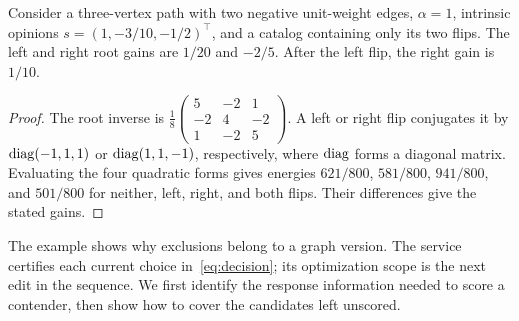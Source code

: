 \begin{proposition}\label{prop:revival}
Consider a three-vertex path with two negative unit-weight edges, $\alpha=1$, intrinsic opinions $s=(1,-3/10,-1/2)^\top$, and a catalog containing only its two flips. The left and right root gains are $1/20$ and $-2/5$. After the left flip, the right gain is $1/10$.
\end{proposition}
\begin{proof}
The root inverse is $\frac18\left(\begin{smallmatrix}5&-2&1\\-2&4&-2\\1&-2&5\end{smallmatrix}\right)$. A left or right flip conjugates it by $\operatorname{diag}(-1,1,1)$ or $\operatorname{diag}(1,1,-1)$, respectively, where $\operatorname{diag}$ forms a diagonal matrix. Evaluating the four quadratic forms gives energies $621/800$, $581/800$, $941/800$, and $501/800$ for neither, left, right, and both flips. Their differences give the stated gains.
\end{proof}

The example shows why exclusions belong to a graph version. The service certifies each current choice in~\eqref{eq:decision}; its optimization scope is the next edit in the sequence. We first identify the response information needed to score a contender, then show how to cover the candidates left unscored.
